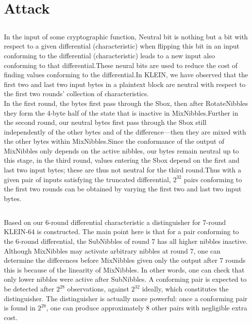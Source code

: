 \documentclass[preprint]{transcrypto}
\begin{document}
\section{Attack}

\subsection{}
In the input of some cryptographic function, Neutral bit is nothing but a bit with respect to a given differential (characteristic) when flipping this bit in an input conforming to the differential (characteristic) leads to a new input also conforming to that differential.These neural bits are used to reduce the cost of finding values conforming to the differential.In KLEIN, we have observed that the first two and last two input bytes in a plaintext block are neutral with respect to the first two rounds’ collection of characteristics.\\

In the first round, the bytes first pass through the Sbox, then after RotateNibbles they form the 4-byte half of the state that is inactive in MixNibbles.Further in the second round, our neutral bytes first pass through the Sbox still independently of the other bytes and of the difference—then they are mixed with the other bytes within MixNibbles.Since the conformance of the output of MixNibbles only depends on the active nibbles, our bytes remain neutral up to this stage, in the third round, values entering the Sbox depend on the first and last two input bytes; these are thus not neutral for the third round.Thus with a given pair of inputs satisfying the truncated differential, $2^{32}$ pairs
conforming to the first two rounds can be obtained by varying the first two and last two input bytes.\\

\subsection{}
Based on our 6-round differential characteristic a distinguisher for 7-round KLEIN-64 is constructed. The main point here is that for a pair conforming to the 6-round differential, the SubNibbles of round 7 has all higher nibbles inactive. Although MixNibbles may activate arbitrary nibbles at round 7, one can determine the differences before MixNibbles given only the output after 7 rounds this is because of the linearity of MixNibbles. In other words, one can check that only lower nibbles were active after SubNibbles. A conforming pair is expected to be detected after $2^{28}$ observations, against $2^{32}$ ideally, which constitutes the distinguisher. The distinguisher is actually more powerful: once a conforming pair is found in $2^{28}$, one can produce approximately 8 other pairs with negligible extra cost.\\
\end{document}
